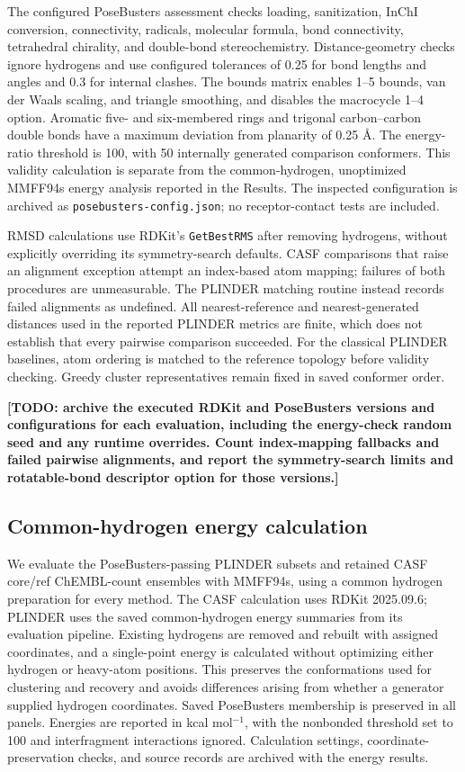 The configured PoseBusters assessment checks loading, sanitization, InChI conversion,
connectivity, radicals, molecular formula, bond connectivity, tetrahedral chirality,
and double-bond stereochemistry. Distance-geometry checks ignore hydrogens and use
configured tolerances of 0.25 for bond lengths and angles and 0.3 for internal clashes.
The bounds matrix enables 1--5 bounds, van der Waals scaling, and triangle smoothing,
and disables the macrocycle 1--4 option. Aromatic five- and six-membered rings and
trigonal carbon--carbon double bonds have a maximum deviation from planarity of
0.25 \AA{}. The energy-ratio threshold is 100, with 50 internally generated comparison
conformers. This validity calculation is separate from the common-hydrogen,
unoptimized MMFF94s energy analysis reported in the Results. The inspected configuration
is archived as \texttt{posebusters-config.json}; no receptor-contact tests are included.

RMSD calculations use RDKit's \texttt{GetBestRMS} after removing hydrogens, without
explicitly overriding its symmetry-search defaults. CASF comparisons that raise an
alignment exception attempt an index-based atom mapping; failures of both procedures
are unmeasurable. The PLINDER matching routine instead records failed alignments as
undefined. All nearest-reference and nearest-generated distances used in the reported
PLINDER metrics are finite, which does not establish that every pairwise comparison
succeeded. For the classical PLINDER baselines, atom ordering is matched to the reference
topology before validity checking. Greedy cluster representatives remain fixed in
saved conformer order.

\textbf{[TODO: archive the executed RDKit and PoseBusters versions and configurations
for each evaluation, including the energy-check random seed and any
runtime overrides. Count index-mapping fallbacks and failed pairwise alignments,
and report the symmetry-search limits and rotatable-bond descriptor option for
those versions.]}

\subsection*{Common-hydrogen energy calculation}

We evaluate the PoseBusters-passing PLINDER subsets and retained CASF core/ref
ChEMBL-count ensembles with MMFF94s, using a common hydrogen preparation for every method.
The CASF calculation uses RDKit 2025.09.6; PLINDER uses the saved common-hydrogen
energy summaries from its evaluation pipeline. Existing hydrogens are removed and rebuilt with assigned coordinates, and a single-point
energy is calculated without optimizing either hydrogen or heavy-atom positions. This preserves the conformations used for
clustering and recovery and avoids differences arising from whether a generator supplied
hydrogen coordinates. Saved PoseBusters membership is preserved in all panels.
Energies are reported in kcal mol$^{-1}$, with the nonbonded threshold set to 100
and interfragment interactions ignored. Calculation settings,
coordinate-preservation checks, and source records are archived with the energy results.

